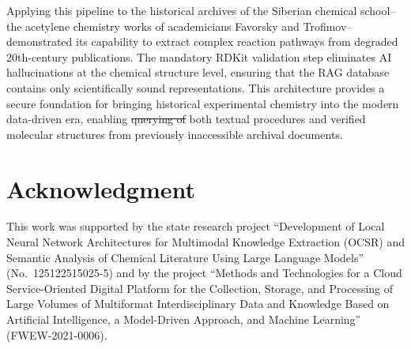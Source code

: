 \documentclass[conference]{IEEEtran}
\makeatletter
\providecommand{\DIFadd}[1]{{\protect\color{blue}\uwave{#1}}} %
\providecommand{\DIFdel}[1]{{\protect\color{red}\sout{#1}}} %
\providecommand{\DIFaddbegin}{} %
\providecommand{\DIFaddend}{} %
\providecommand{\DIFdelbegin}{} %
\providecommand{\DIFdelend}{} %
\providecommand{\DIFscaledelfig}{0.5}
\newlength{\DIFdelgraphicswidth} %
\newlength{\DIFdelgraphicsheight} %
\providecommand{\DIFaddincludegraphics}[2][]{{\color{blue}\fbox{\DIFOincludegraphics[#1]{#2}}}} %
\providecommand{\DIFdelincludegraphics}[2][]{%
\sbox{\DIFdelgraphicsbox}{\DIFOincludegraphics[#1]{#2}}%
\settoboxwidth{\DIFdelgraphicswidth}{\DIFdelgraphicsbox} %
\settoboxtotalheight{\DIFdelgraphicsheight}{\DIFdelgraphicsbox} %
\scalebox{\DIFscaledelfig}{%
\parbox[b]{\DIFdelgraphicswidth}{\usebox{\DIFdelgraphicsbox}\\[-\baselineskip] \rule{\DIFdelgraphicswidth}{0em}}\llap{\resizebox{\DIFdelgraphicswidth}{\DIFdelgraphicsheight}{%
\setlength{\unitlength}{\DIFdelgraphicswidth}%
\begin{picture}(1,1)%
\thicklines\linethickness{2pt} %
{\color[rgb]{1,0,0}\put(0,0){\framebox(1,1){}}}%
{\color[rgb]{1,0,0}\put(0,0){\line( 1,1){1}}}%
{\color[rgb]{1,0,0}\put(0,1){\line(1,-1){1}}}%
\end{picture}%
}\hspace*{3pt}}} %
} %
\DeclareRobustCommand{\DIFaddbegin}{\DIFOaddbegin \let\includegraphics\DIFaddincludegraphics} %
\DeclareRobustCommand{\DIFaddend}{\DIFOaddend \let\includegraphics\DIFOincludegraphics} %
\DeclareRobustCommand{\DIFdelbegin}{\DIFOdelbegin \let\includegraphics\DIFdelincludegraphics} %
\DeclareRobustCommand{\DIFdelend}{\DIFOaddend \let\includegraphics\DIFOincludegraphics} %
\let\sout@orig\sout %
\renewcommand{\sout}[1]{\ifmmode\text{\sout@orig{\ensuremath{#1}}}\else\sout@orig{#1}\fi} %
\makeatother
\begin{document}
Applying this pipeline to the historical archives of the Siberian chemical school--the acetylene chemistry works of academicians Favorsky and Trofimov--demonstrated its capability to extract complex reaction pathways from degraded 20th-century publications. The mandatory RDKit validation step eliminates AI hallucinations at the chemical structure level, ensuring that the RAG database contains only scientifically sound representations. This architecture provides a secure foundation for bringing historical experimental chemistry into the modern data-driven era, enabling \DIFdelbegin \DIFdel{querying of }\DIFdelend \DIFaddbegin \DIFadd{queries on }\DIFaddend both textual procedures and verified molecular structures from previously inaccessible archival documents.

\section*{Acknowledgment}

This work was supported by the state research project ``Development of Local Neural Network Architectures for Multimodal Knowledge Extraction (OCSR) and Semantic Analysis of Chemical Literature Using Large Language Models'' (No.~125122515025-5) and by the project ``Methods and Technologies for a Cloud Service-Oriented Digital Platform for the Collection, Storage, and Processing of Large Volumes of Multiformat Interdisciplinary Data and Knowledge Based on Artificial Intelligence, a Model-Driven Approach, and Machine Learning'' (FWEW-2021-0006).
\end{document}
